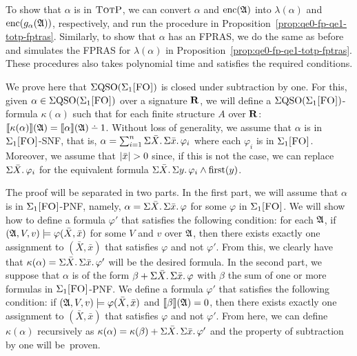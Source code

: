To show that $\alpha$ is in $\text{\sc TotP}$, we can convert $\alpha$ and ${\rm enc}(\mathfrak{A})$ into $\lambda(\alpha)$ and ${\rm enc}(g_{\alpha}(\mathfrak{A}))$, respectively, and run the procedure in Proposition~\ref{prop:qe0-fp-qe1-totp-fptras}. Similarly, to show that $\alpha$ has an FPRAS, we do the same as before and simulates the FPRAS for $\lambda(\alpha)$ in Proposition~\ref{prop:qe0-fp-qe1-totp-fptras}. These procedures also takes polynomial time and satisfies the required conditions.

\medskip


 We prove here that $\Sigma{\rm QSO}(\Sigma_{1}\textsc{[FO]})$ is closed under subtraction by one. 
For this, given $\alpha \in \Sigma{\rm QSO}(\Sigma_{1}\textsc{[FO]})$ over a signature $\mathbf{R}$, we will define a $\Sigma{\rm QSO}(\Sigma_{1}\textsc{[FO]})$-formula $\kappa(\alpha)$ such that for each finite structure $A$ over $\mathbf{R}$: $\sem{\kappa(\alpha)}(\A) = \sem{\alpha}(\A) \dotminus 1$. 
Without loss of generality, we assume that $\alpha$ is in $\Sigma_{1}\textsc{[FO]}$-SNF, that is, $\alpha = \sum_{i = 1}^{n}\Sigma{\bar{X}}.\,\Sigma{\bar{x}}.\,\varphi_i$ where each $\varphi_i$ is in $\Sigma_{1}\textsc{[FO]}$. Moreover, we assume that $\vert \bar{x} \vert > 0$  since, if this is not the case, we can replace $\Sigma{\bar{X}}.\,\varphi_i$ for the equivalent formula $\Sigma{\bar{X}}.\, \Sigma{y}.\, \varphi_i \wedge\operatorname{first}(y)$.

The proof will be separated in two parts. In the first part, we will assume that  $\alpha$ is in $\Sigma_{1}\textsc{[FO]}$-PNF, namely, $\alpha = \Sigma{\bar{X}}.\,\Sigma{\bar{x}}.\,\varphi$ for some $\varphi$ in $\Sigma_{1}\textsc{[FO]}$. We will show how to define a formula $\varphi'$ that satisfies the following condition: for each $\mathfrak{A}$, if $(\mathfrak{A},V,v)\models \varphi(\bar{X},\bar{x})$ for some $V$ and $v$ over $\mathfrak{A}$, then there exists exactly one assignment to $(\bar{X},\bar{x})$ that satisfies $\varphi$ and not $\varphi'$. 
From this, we clearly have that $\kappa(\alpha) = \Sigma{\bar{X}}.\,\Sigma{\bar{x}}.\,\varphi'$ will be the desired formula. In the second part, we suppose that $\alpha$ is of the form $\beta + \Sigma{\bar{X}}.\,\Sigma{\bar{x}}.\,\varphi$ with $\beta$ the sum of one or more formulas in $\Sigma_{1}\textsc{[FO]}$-PNF. 
We define a formula $\varphi'$ that satisfies the following condition: if $(\mathfrak{A},V,v)\models \varphi(\bar{X},\bar{x})$ and ${\llbracket{}{\beta}\rrbracket}(\mathfrak{A}) = 0$, then there exists exactly one assignment to $(\bar{X},\bar{x})$ that satisfies $\varphi$ and not $\varphi'$. From here, we can define $\kappa(\alpha)$ recursively as  $\kappa(\alpha) = \kappa(\beta) +  \Sigma{\bar{X}}.\,\Sigma{\bar{x}}.\,\varphi'$ and the property of subtraction by one will be~proven.

\medskip

